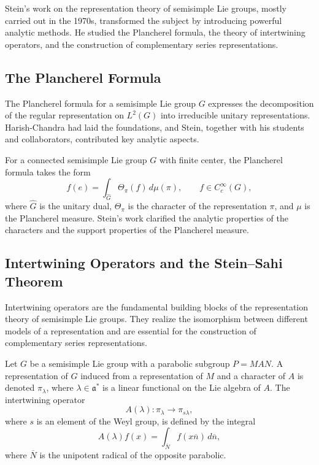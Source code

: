 Stein's work on the representation theory of semisimple Lie groups, mostly carried out in the 1970s, transformed the subject by introducing powerful analytic methods. He studied the Plancherel formula, the theory of intertwining operators, and the construction of complementary series representations.

\subsection{The Plancherel Formula}

The Plancherel formula for a semisimple Lie group \(G\) expresses the decomposition of the regular representation on \(L^2(G)\) into irreducible unitary representations. Harish-Chandra had laid the foundations, and Stein, together with his students and collaborators, contributed key analytic aspects.

For a connected semisimple Lie group \(G\) with finite center, the Plancherel formula takes the form
\[
f(e) = \int_{\widehat{G}} \Theta_\pi(f)\, d\mu(\pi), \qquad f \in C_c^\infty(G),
\]
where \(\widehat{G}\) is the unitary dual, \(\Theta_\pi\) is the character of the representation \(\pi\), and \(\mu\) is the Plancherel measure. Stein's work clarified the analytic properties of the characters and the support properties of the Plancherel measure.

\subsection{Intertwining Operators and the Stein--Sahi Theorem}

Intertwining operators are the fundamental building blocks of the representation theory of semisimple Lie groups. They realize the isomorphism between different models of a representation and are essential for the construction of complementary series representations.

Let \(G\) be a semisimple Lie group with a parabolic subgroup \(P = MAN\). A representation of \(G\) induced from a representation of \(M\) and a character of \(A\) is denoted \(\pi_{\lambda}\), where \(\lambda \in \mathfrak{a}^*\) is a linear functional on the Lie algebra of \(A\). The intertwining operator
\[
A(\lambda): \pi_{\lambda} \longrightarrow \pi_{s\lambda},
\]
where \(s\) is an element of the Weyl group, is defined by the integral
\[
A(\lambda)f(x) = \int_{\overline{N}} f(x\overline{n})\,d\overline{n},
\]
where \(\overline{N}\) is the unipotent radical of the opposite parabolic.

